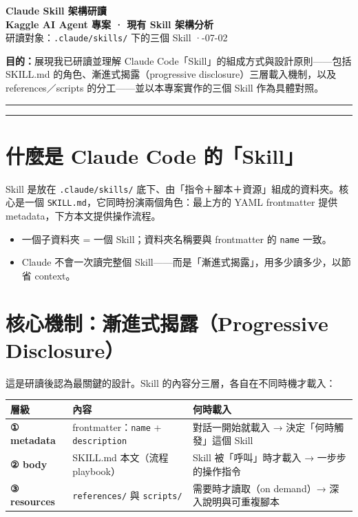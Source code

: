 \documentclass[11pt]{ctexart}
\newcommand{\code}[1]{\texttt{#1}}
\begin{document}
\begin{center}
  {\color{navy}\Huge\bfseries Claude Skill 架構研讀}\\[6pt]
  {\color{grey}\Large\bfseries Kaggle AI Agent 專案 · 現有 Skill 架構分析}\\[10pt]
  {\color{grey}研讀對象：\code{.claude/skills/} 下的三個 Skill \quad·-07-02}
\end{center}

\vspace{1em}
\noindent\textbf{目的：}展現我已研讀並理解 Claude Code「Skill」的組成方式與設計原則——包括
SKILL.md 的角色、漸進式揭露（progressive disclosure）三層載入機制，以及
references／scripts 的分工——並以本專案實作的三個 Skill 作為具體對照。

\vspace{0.5em}
\hrule
\tableofcontents
\vspace{0.5em}
\hrule

\section{什麼是 Claude Code 的「Skill」}
Skill 是放在 \code{.claude/skills/} 底下、由「指令＋腳本＋資源」組成的資料夾。核心是一個
\code{SKILL.md}，它同時扮演兩個角色：最上方的 YAML frontmatter 提供 metadata，下方本文提供操作流程。
\begin{itemize}
  \item 一個子資料夾 = 一個 Skill；資料夾名稱要與 frontmatter 的 \code{name} 一致。
  \item Claude 不會一次讀完整個 Skill——而是「漸進式揭露」，用多少讀多少，以節省 context。
\end{itemize}

\section{核心機制：漸進式揭露（Progressive Disclosure）}
這是研讀後認為最關鍵的設計。Skill 的內容分三層，各自在不同時機才載入：

\vspace{0.4em}
\noindent\begin{tabularx}{\linewidth}{>{\bfseries}l l X}
\arrayrulecolor{navy}\toprule
\rowcolor{headfill}\textbf{層級} & \textbf{內容} & \textbf{何時載入} \\
\midrule
① metadata  & frontmatter：\code{name} + \code{description} & 對話一開始就載入 → 決定「何時觸發」這個 Skill \\
\rowcolor{rowfill}
② body      & SKILL.md 本文（流程 playbook） & Skill 被「呼叫」時才載入 → 一步步的操作指令 \\
③ resources & \code{references/} 與 \code{scripts/} & 需要時才讀取（on demand）→ 深入說明與可重複腳本 \\
\bottomrule
\end{tabularx}
\end{document}
